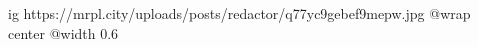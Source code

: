  
 
 
 
 

\ifcmt
  ig https://mrpl.city/uploads/posts/redactor/q77yc9gebef9mepw.jpg
  @wrap center
  @width 0.6
\fi
